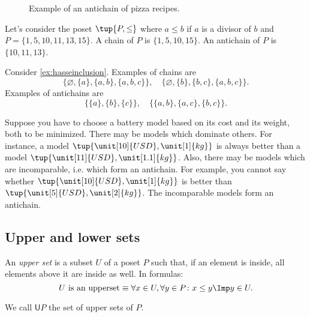 \begin{figure}[h!]
\begin{center}
\end{center}
\caption{Example of an antichain of pizza recipes. \label{fig:antichain}}
\end{figure}


\begin{example}
Let's consider the poset $\tup{P,\leq}$ where $a\leq b$ if $a$ is a divisor of $b$ and $P=\{1,5,10,11,13,15\}$. A chain of $P$ is $\{1,5,10,15\}$. An antichain of $P$ is $\{10,11,13\}$.
\end{example}

\begin{example}
Consider \cref{ex:hasseinclusion}. Examples of chains are 
\begin{equation}
    \{\varnothing,\{a\},\{a,b\},\{a,b,c\}\}, \quad  \{\varnothing,\{b\},\{b,c\},\{a,b,c\}\}.
\end{equation}
Examples of antichains are
\begin{equation}
    \{\{a\},\{b\},\{c\}\}, \quad \{ \{a,b\},\{a,c\}, \{b,c\}\}.
\end{equation}
\end{example}

\begin{example}
\label{ex:battery}
Suppose you have to choose a battery model based on its cost and its weight, both to be minimized. There may be models which dominate others. For instance, a model $\tup{\unit[10]{USD},\unit[1]{kg}}$ is always better than a model $\tup{\unit[11]{USD},\unit[1.1]{kg}}$. Also, there may be models which are incomparable, i.e. which form an antichain. For example, you cannot say whether $\tup{\unit[10]{USD},\unit[1]{kg}}$ is better than  $\tup{\unit[5]{USD},\unit[2]{kg}}$. The incomparable models form an antichain.
\end{example}

\subsection{Upper and lower sets}

\begin{definition}
\label{def:upperset}
An \emph{upper set} is a subset $U$ of a poset $P$ such
that, if an element is inside, all elements above it are inside as well.
In formulas:
\begin{equation}
\text{$U$ is an upperset} \equiv \forall x\in U, \forall y\in P\colon x\leq y \Imp y\in U.
\end{equation}
\end{definition}
\begin{remark}
We call $\mathsf{U}P$ the set of upper sets of $P$.
\end{remark}



